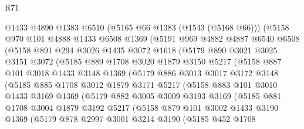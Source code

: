\begin{lexlean}{R71}
\begin{coremodule}
        @1433
        @4890
        @1383
        @6510
        (@5165 @66 @1383 (@1543 (@5168 @66)))
        (@5158
          @970
          @101
          @4888
          @1433
          @6508
          @1369
          (@5191
            @969
            @4882
            @4887
            @6540
            @6508
            (@5158
              @891
              @294
              @3026
              @1435
              @3072
              @1618
              (@5179
                @890
                @3021
                @3025
                @3151
                @3072
                (@5185
                  @889
                  @1708
                  @3020
                  @1879
                  @3150
                  @5217
                  (@5158
                    @887
                    @101
                    @3018
                    @1433
                    @3148
                    @1369
                    (@5179
                      @886
                      @3013
                      @3017
                      @3172
                      @3148
                      (@5185
                        @885
                        @1708
                        @3012
                        @1879
                        @3171
                        @5217
                        (@5158
                          @883
                          @101
                          @3010
                          @1433
                          @3169
                          @1369
                          (@5179
                            @882
                            @3005
                            @3009
                            @3193
                            @3169
                            (@5185
                              @881
                              @1708
                              @3004
                              @1879
                              @3192
                              @5217
                              (@5158
                                @879
                                @101
                                @3002
                                @1433
                                @3190
                                @1369
                                (@5179
                                  @878
                                  @2997
                                  @3001
                                  @3214
                                  @3190
                                  (@5185
                                    @452
                                    @1708

\end{coremodule}
\end{lexlean}

